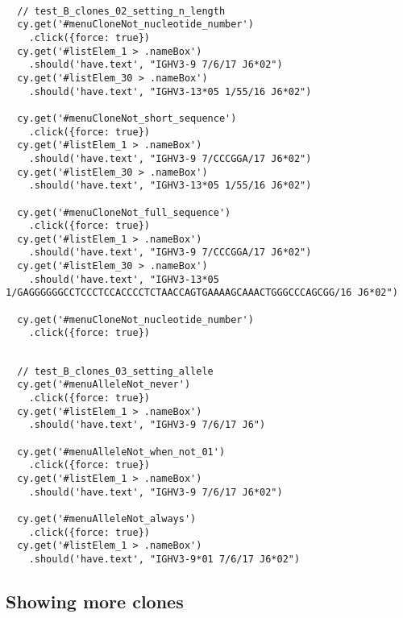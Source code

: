 \begin{verbatim}

  // test_B_clones_02_setting_n_length
  cy.get('#menuCloneNot_nucleotide_number')
    .click({force: true})
  cy.get('#listElem_1 > .nameBox')
    .should('have.text', "IGHV3-9 7/6/17 J6*02")
  cy.get('#listElem_30 > .nameBox')
    .should('have.text', "IGHV3-13*05 1/55/16 J6*02")

  cy.get('#menuCloneNot_short_sequence')
    .click({force: true})
  cy.get('#listElem_1 > .nameBox')
    .should('have.text', "IGHV3-9 7/CCCGGA/17 J6*02")
  cy.get('#listElem_30 > .nameBox')
    .should('have.text', "IGHV3-13*05 1/55/16 J6*02")

  cy.get('#menuCloneNot_full_sequence')
    .click({force: true})
  cy.get('#listElem_1 > .nameBox')
    .should('have.text', "IGHV3-9 7/CCCGGA/17 J6*02")
  cy.get('#listElem_30 > .nameBox')
    .should('have.text', "IGHV3-13*05 1/GAGGGGGGCCTCCCTCCACCCCTCTAACCAGTGAAAAGCAAACTGGGCCCAGCGG/16 J6*02")

  cy.get('#menuCloneNot_nucleotide_number')
    .click({force: true})

\end{verbatim}



\begin{verbatim}

  // test_B_clones_03_setting_allele
  cy.get('#menuAlleleNot_never')
    .click({force: true})
  cy.get('#listElem_1 > .nameBox')
    .should('have.text', "IGHV3-9 7/6/17 J6")

  cy.get('#menuAlleleNot_when_not_01')
    .click({force: true})
  cy.get('#listElem_1 > .nameBox')
    .should('have.text', "IGHV3-9 7/6/17 J6*02")

  cy.get('#menuAlleleNot_always')
    .click({force: true})
  cy.get('#listElem_1 > .nameBox')
    .should('have.text', "IGHV3-9*01 7/6/17 J6*02")

\end{verbatim}

\subsection{Showing more clones}

